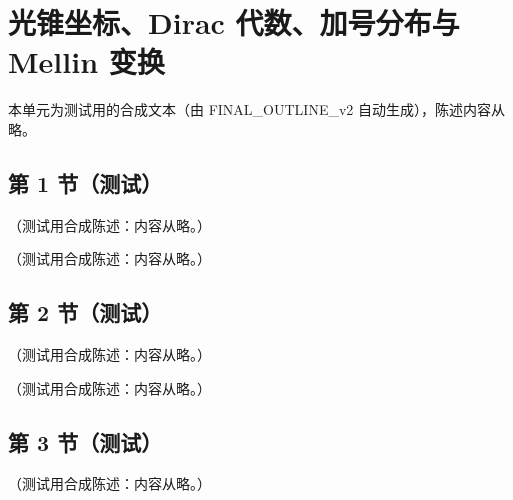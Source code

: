 \chapter{光锥坐标、Dirac 代数、加号分布与 Mellin 变换}\label{app:appA}
本单元为测试用的合成文本（由 FINAL\_OUTLINE\_v2 自动生成），陈述内容从略。

\section{第 1 节（测试）}\label{sec:appA-lightfront}

\begin{lemma}[共线 Fierz 分解]\label{lem:appA-fierz}
（测试用合成陈述：内容从略。）
\end{lemma}

\begin{definition}[测试函数类与弱收敛]\label{def:appA-test-functions}
（测试用合成陈述：内容从略。）
\end{definition}

\section{第 2 节（测试）}\label{sec:appA-dirac}

\begin{lemma}[乘积约定下的恒等式]\label{lem:appA-plus-product}
（测试用合成陈述：内容从略。）
\end{lemma}

\begin{lemma}[由偶数矩得到弱收敛]\label{lem:appA-weak-convergence}
（测试用合成陈述：内容从略。）
\end{lemma}

\section{第 3 节（测试）}\label{sec:appA-plus}

\begin{lemma}\label{lem:appA-mellin-table}
（测试用合成陈述：内容从略。）
\end{lemma}
